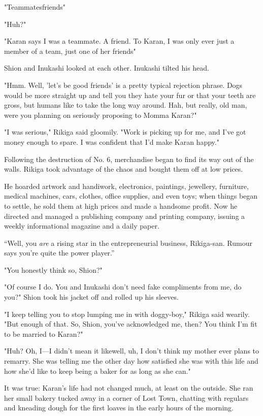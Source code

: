 "\el Teammates\el friends\el "

"Huh?"

"Karan says I was a teammate. A friend. To Karan, I was only ever just a
member of a team, just one of her friends\el "

Shion and Inukashi looked at each other. Inukashi tilted his head.

"Hmm. Well, 'let's be good friends' is a pretty typical rejection
phrase. Dogs would be more straight up and tell you they hate your fur
or that your teeth are gross, but humans like to take the long way
around. Hah, but really, old man, were you planning on seriously
proposing to Momma Karan?"

"\el I was serious," Rikiga said gloomily. "Work is picking up for me,
and I've got money enough to spare. I was confident that I'd make Karan
happy."

Following the destruction of No. 6, merchandise began to find its way
out of the walls. Rikiga took advantage of the chaos and bought them off
at low prices.

He hoarded artwork and handiwork, electronics, paintings, jewellery,
furniture, medical machines, cars, clothes, office supplies, and even
toys; when things began to settle, he sold them at high prices and made
a handsome profit. Now he directed and managed a publishing company and
printing company, issuing a weekly informational magazine and a daily
paper.

``Well, you \emph{are} a rising star in the entrepreneurial business,
Rikiga-san. Rumour says you're quite the power player.''

"You honestly think so, Shion?"

"Of course I do. You and Inukashi don't need fake compliments from me,
do you?" Shion took his jacket off and rolled up his sleeves.

"I keep telling you to stop lumping me in with doggy-boy," Rikiga said
wearily. "But enough of that. So, Shion, you've acknowledged me, then?
You think I'm fit to be married to Karan?"

"Huh? Oh, I---I didn't mean it like\el well, uh, I don't think my mother
ever plans to remarry. She was telling me the other day how satisfied
she was with this life and how she'd like to keep being a baker for as
long as she can."

It was true: Karan's life had not changed much, at least on the outside.
She ran her small bakery tucked away in a corner of Lost Town, chatting
with regulars and kneading dough for the first loaves in the early hours
of the morning.

